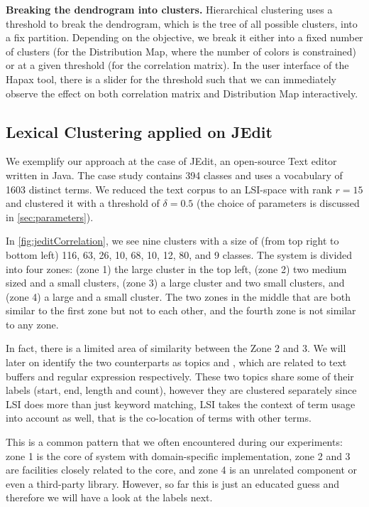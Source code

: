   \textbf{Breaking the dendrogram into clusters.} Hierarchical clustering uses a threshold to break the dendrogram, which is the tree of all possible clusters, into a fix partition. Depending on the objective, we break it either into a fixed number of clusters (\eg for the Distribution Map, where the number of colors is constrained) or at a given threshold (\eg for the correlation matrix). In the user interface of the Hapax tool, there is a slider for the threshold such that we can immediately observe the effect on both correlation matrix and Distribution Map interactively.

\subsection{Lexical Clustering applied on JEdit}

We exemplify our approach at the case of JEdit, an open-source Text editor written in Java. The case study contains 394 classes and uses a vocabulary of 1603 distinct terms. We reduced the text corpus to an LSI-space with rank $r = 15$ and clustered it with a threshold of $\delta = 0.5$ (the choice of parameters is discussed in \autoref{sec:parameters}).

In \autoref{fig:jeditCorrelation}, we see nine clusters with a size of (from top right to bottom left) 116, 63, 26, 10, 68, 10, 12, 80, and 9 classes. The system is divided into four zones: (zone 1) the large cluster in the top left, (zone 2) two medium sized and a small clusters, (zone 3) a large cluster and two small clusters, and (zone 4) a large and a small cluster. The two zones in the middle that are both similar to the first zone but not to each other, and the fourth zone is not similar to any zone.

In fact, there is a limited area of similarity between the Zone 2 and 3. We will later on identify the two counterparts as topics \pink and \cyan, which are related to text buffers and regular expression respectively. These two topics share some of their labels (\ie start, end, length and count), however they are clustered separately since LSI does more than just keyword matching, LSI takes the context of term usage into account as well, that is the co-location of terms with other terms.

This is a common pattern that we often encountered during our experiments: zone 1 is the core of system with domain-specific implementation, zone 2 and 3 are facilities closely related to the core, and zone 4 is an unrelated component or even a third-party library. However, so far this is just an educated guess and therefore we will have a look at the labels next.

